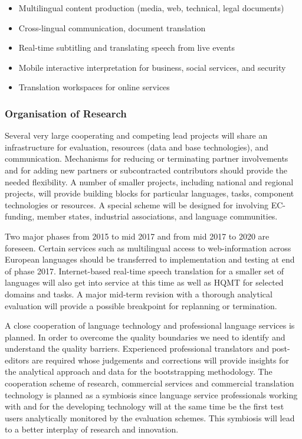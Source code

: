 \documentclass[10pt, plain]{../../metanetpaper}
\begin{document}
\begin{multicols}{2}
\begin{itemize}
\item Multilingual content production (media, web, technical, legal documents)
\item Cross-lingual communication, document translation
\item Real-time subtitling and translating speech from live events
\item Mobile interactive interpretation for business, social services, and security
\item Translation workspaces for online services
\end{itemize}

\subsubsection{Organisation of Research}
\label{sec:organ-rese-pt1}

Several very large cooperating and competing lead projects will share an infrastructure for evaluation, resources (data and base technologies), and communication. Mechanisms for reducing or terminating partner involvements and for adding new partners or subcontracted contributors should provide the needed flexibility. A number of smaller projects, including national and regional projects, will provide building blocks for particular languages, tasks, component technologies or resources. A special scheme will be designed for involving EC-funding, member states, industrial associations, and language communities.
 
Two major phases from 2015 to mid 2017 and from mid 2017 to 2020 are foreseen. Certain services such as multilingual access to web-information across European languages should be transferred to implementation and testing at end of phase 2017. Internet-based real-time speech translation for a smaller set of languages will also get into service at this time as well as HQMT for selected domains and tasks. A major mid-term revision with a thorough analytical evaluation will provide a possible breakpoint for replanning or termination.
 
A close cooperation of language technology and professional language services is planned. In order to overcome the quality boundaries we need to identify and understand the quality barriers. Experienced professional translators and post-editors are required whose judgements and corrections will provide insights for the analytical approach and data for the bootstrapping methodology. The cooperation scheme of research, commercial services and commercial translation technology is planned as a symbiosis since language service professionals working with and for the developing technology will at the same time be the first test users analytically monitored by the evaluation schemes. This symbiosis will lead to a better interplay of research and innovation.
 

\end{multicols}
\end{document}
